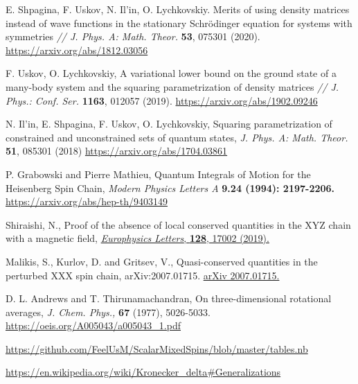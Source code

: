 \documentclass[]{article}
\renewcommand{\[}{\begin{equation}}
\renewcommand{\]}{\end{equation}}
\begin{document}
\begin{thebibliography}{99}
	

	E. Shpagina, F. Uskov, N. Il’in, O. Lychkovskiy. Merits of using density matrices instead of wave
	functions in the stationary Schrödinger equation for systems with symmetries {\it// J. Phys. A: Math. Theor.}
	{\bf 53}, 075301 (2020).
	\href{https://arxiv.org/abs/1812.03056}{https://arxiv.org/abs/1812.03056}
	
	F. Uskov, O. Lychkovskiy, A variational lower bound on the ground state of a many-body system and
	the squaring parametrization of density matrices {\it// J. Phys.: Conf. Ser.} {\bf 1163}, 012057 (2019).
	\href{https://arxiv.org/abs/1902.09246}{https://arxiv.org/abs/1902.09246}

	 N. Il'in, E. Shpagina, F. Uskov, O. Lychkovskiy,
	Squaring parametrization of constrained and unconstrained sets of quantum states, {\it J. Phys. A: Math. Theor.} {\bf 51}, 085301 (2018)
	\href{https://arxiv.org/abs/1704.03861}{https://arxiv.org/abs/1704.03861}
	
	

	
	P. Grabowski and Pierre Mathieu, Quantum Integrals of Motion for the Heisenberg Spin Chain, {\it  Modern Physics Letters A} {\bf 9.24 (1994): 2197-2206.}
	\href{https://arxiv.org/abs/hep-th/9403149}{https://arxiv.org/abs/hep-th/9403149}

	 Shiraishi, N., Proof of the absence of local conserved quantities in the XYZ chain with a magnetic field,  \href{https://doi.org/10.1209/0295-5075/128/17002}{
	{\it Europhysics Letters}, {\bf 128}, 17002 (2019).
	}
    
	 Malikis, S., Kurlov, D. and Gritsev, V., Quasi-conserved quantities in the perturbed XXX spin chain, arXiv:2007.01715. \href{https://arxiv.org/abs/2007.01715}{arXiv 2007.01715.}

	D. L. Andrews and T. Thirunamachandran, On three-dimensional rotational averages, {\it J. Chem. Phys.,} {\bf 67} (1977), 5026-5033.
	\href{https://oeis.org/A005043/a005043_1.pdf}
	{https://oeis.org/A005043/a005043\_1.pdf}

	\href{https://github.com/FeelUsM/ScalarMixedSpins/blob/master/tables.nb}
	{https://github.com/FeelUsM/ScalarMixedSpins/blob/master/tables.nb}
	
	\href{https://en.wikipedia.org/wiki/Kronecker_delta#Generalizations}
	{https://en.wikipedia.org/wiki/Kronecker\_delta\#Generalizations}
	
\end{thebibliography}
\end{document}

